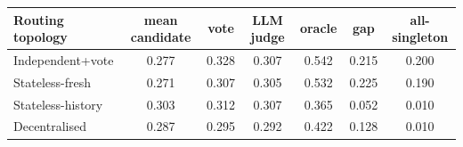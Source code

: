 \begin{tabular}{lcccccc}
\toprule
Routing topology & mean candidate & vote & LLM judge & oracle & gap & all-singleton \\
\midrule
Independent+vote & 0.277 & 0.328 & 0.307 & 0.542 & 0.215 & 0.200 \\
Stateless-fresh & 0.271 & 0.307 & 0.305 & 0.532 & 0.225 & 0.190 \\
Stateless-history & 0.303 & 0.312 & 0.307 & 0.365 & 0.052 & 0.010 \\
Decentralised & 0.287 & 0.295 & 0.292 & 0.422 & 0.128 & 0.010 \\
\bottomrule
\end{tabular}
